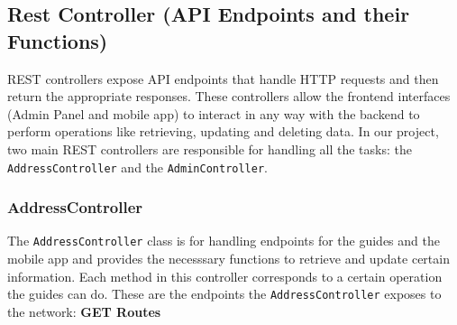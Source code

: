     \subsection{Rest Controller (API Endpoints and their Functions)}

    REST controllers expose API endpoints that handle HTTP requests and then return the appropriate responses. These controllers allow the frontend interfaces (Admin Panel and mobile app) to interact in any way with the backend to perform operations like retrieving, updating and deleting data. In our project, two main REST controllers are responsible for handling all the tasks: the \texttt{AddressController} and the \texttt{AdminController}.

    \subsubsection{AddressController}
    The \texttt{AddressController} class is for handling endpoints for the guides and the mobile app and provides the necesssary functions to retrieve and update certain information. Each method in this controller corresponds to a certain operation the guides can do. These are the endpoints the \texttt{AddressController} exposes to the network: \newline \newline
    \textbf{GET Routes} 
